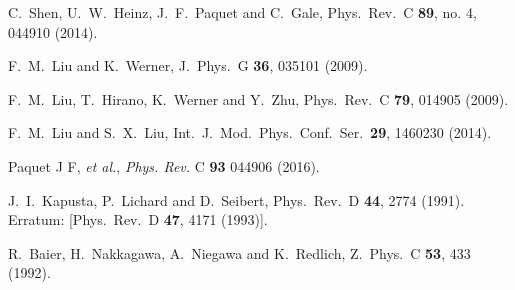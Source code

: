 \documentclass[aps,prc,a4paper,nofootinbib,
preprintnumbers,superscriptaddress,twocolumn,showpacs,showkeys]{revtex4}
\begin{document}
\begin{thebibliography}{99}

  C.~Shen, U.~W.~Heinz, J.~F.~Paquet and C.~Gale,
  Phys.\ Rev.\ C {\bf 89}, no. 4, 044910 (2014).

  F.~M.~Liu and K.~Werner,
  J.\ Phys.\ G {\bf 36}, 035101 (2009).


  F.~M.~Liu, T.~Hirano, K.~Werner and Y.~Zhu,
  Phys.\ Rev.\ C {\bf 79}, 014905 (2009).


  F.~M.~Liu and S.~X.~Liu,
  Int.\ J.\ Mod.\ Phys.\ Conf.\ Ser.\  {\bf 29}, 1460230 (2014).
  
  
  
  
  
 Paquet J F, {\em et al.}, {\it Phys. Rev.} C {\bf 93} 044906 (2016).

  J.~I.~Kapusta, P.~Lichard and D.~Seibert,
  Phys.\ Rev.\ D {\bf 44}, 2774 (1991).
  Erratum: [Phys.\ Rev.\ D {\bf 47}, 4171 (1993)].

  R.~Baier, H.~Nakkagawa, A.~Niegawa and K.~Redlich,
  Z.\ Phys.\ C {\bf 53}, 433 (1992).


\end{thebibliography}
\end{document}
